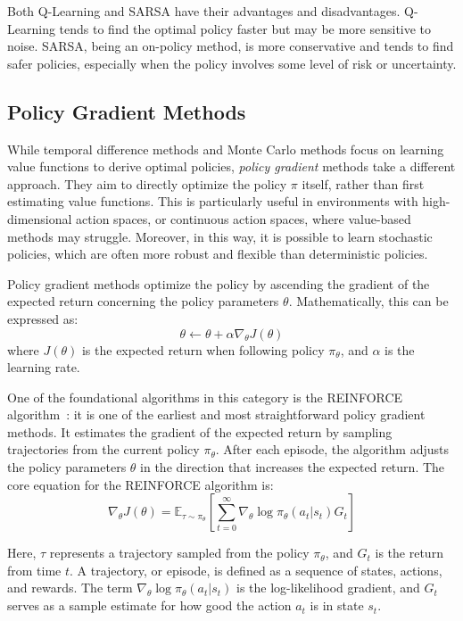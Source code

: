  Both Q-Learning and SARSA have their advantages and disadvantages. 
  Q-Learning tends to find the optimal policy faster but may be more sensitive to noise. 
  SARSA, being an on-policy method, is more conservative and tends to find safer policies, 
  especially when the policy involves some level of risk or uncertainty.

\subsection{Policy Gradient Methods}

While temporal difference methods and Monte Carlo methods focus on learning value functions to derive optimal policies, 
 \emph{policy gradient} methods take a different approach. 
%
They aim to directly optimize the policy \(\pi\) itself, 
 rather than first estimating value functions. 
%
This is particularly useful in environments with high-dimensional action spaces, 
 or continuous action spaces, where value-based methods may struggle.
%
Moreover, in this way, it is possible to learn stochastic policies,
 which are often more robust and flexible than deterministic policies.

Policy gradient methods optimize the policy by ascending the gradient of the expected return concerning the policy parameters \(\theta\). 
Mathematically, this can be expressed as:
\begin{equation}
\theta \leftarrow \theta + \alpha \nabla_\theta J(\theta)
\end{equation}
where \(J(\theta)\) is the expected return when following policy \(\pi_\theta\), 
 and \(\alpha\) is the learning rate.

One of the foundational algorithms in this category is the REINFORCE algorithm~\cite{DBLP:conf/nips/SuttonMSM99}: 
 it is one of the earliest and most straightforward policy gradient methods. 
It estimates the gradient of the expected return by sampling trajectories from the current policy \(\pi_\theta\). 
After each episode, the algorithm adjusts the policy parameters \(\theta\) in the direction that increases the expected return.
%
The core equation for the REINFORCE algorithm is:
\begin{equation}
\nabla_\theta J(\theta) = \mathbb{E}_{\tau \sim \pi_\theta} \left[ \sum_{t=0}^{\infty} \nabla_\theta \log \pi_\theta(a_t | s_t) G_t \right]
\end{equation}

Here, \(\tau\) represents a trajectory sampled from the policy \(\pi_\theta\), 
 and \(G_t\) is the return from time \(t\). 
A trajectory, or episode, is defined as a sequence of states, actions, and rewards.
%
The term \(\nabla_\theta \log \pi_\theta(a_t | s_t)\) is the log-likelihood gradient, 
 and \(G_t\) serves as a sample estimate for how good the action \(a_t\) is in state \(s_t\).

